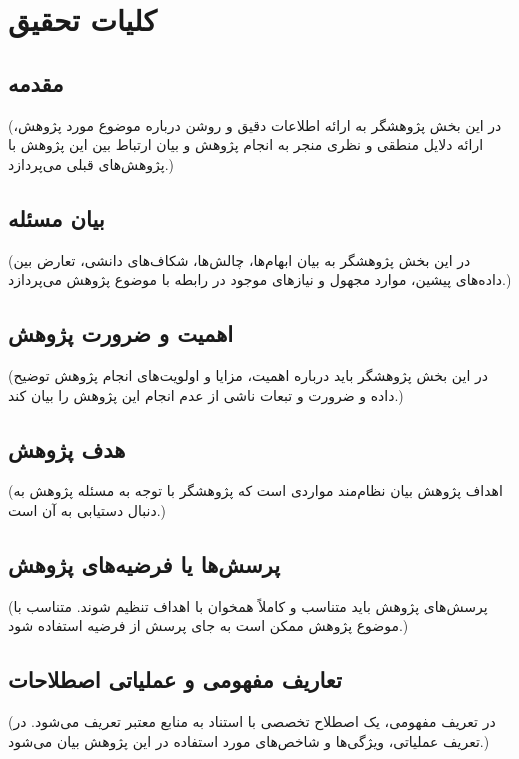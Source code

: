 \chapter{کلیات تحقیق}

\section{مقدمه}
(در این بخش پژوهشگر به ارائه اطلاعات دقیق و روشن درباره موضوع مورد پژوهش، ارائه دلایل منطقی و نظری منجر به انجام پژوهش و بیان ارتباط بین این پژوهش با پژوهش‌های قبلی می‌پردازد.)

\section{بیان مسئله}
(در این بخش پژوهشگر به بیان ابهام‌ها، چالش‌ها، شکاف‌های دانشی، تعارض بین داده‌های پیشین، موارد مجهول و نیازهای موجود در رابطه با موضوع پژوهش می‌پردازد.)

\section{اهمیت و ضرورت پژوهش}
(در این بخش پژوهشگر باید درباره اهمیت، مزایا و اولویت‌های انجام پژوهش توضیح داده و ضرورت و تبعات ناشی از عدم انجام این پژوهش را بیان کند.)

\section{هدف پژوهش}
(اهداف پژوهش بیان نظام‌مند مواردی است که پژوهشگر با توجه به مسئله پژوهش به دنبال دستیابی به آن است.)

\section{پرسش‌ها یا فرضیه‌های پژوهش}
(پرسش‌های پژوهش باید متناسب و کاملاً همخوان با اهداف تنظیم شوند. متناسب با موضوع پژوهش ممکن است به جای پرسش از فرضیه استفاده شود.)

\section{تعاریف مفهومی و عملیاتی اصطلاحات}
(در تعریف مفهومی، یک اصطلاح تخصصی با استناد به منابع معتبر تعریف می‌شود. در تعریف عملیاتی، ویژگی‌ها و شاخص‌های مورد استفاده در این پژوهش بیان می‌شود.)